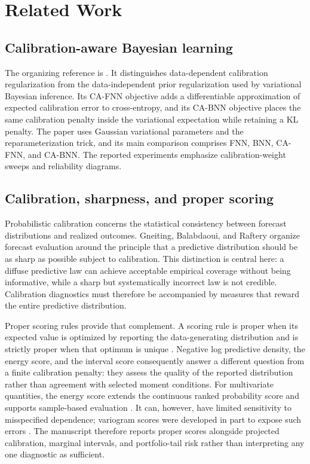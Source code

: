 \documentclass[11pt]{article}
\begin{document}
\section{Related Work}

\subsection{Calibration-aware Bayesian learning}

The organizing reference is \cite{huang2024cabl}. It distinguishes
data-dependent calibration regularization from the data-independent prior
regularization used by variational Bayesian inference. Its CA-FNN objective adds a
differentiable approximation of expected calibration error to cross-entropy, and
its CA-BNN objective places the same calibration penalty inside the variational
expectation while retaining a KL penalty. The paper uses Gaussian variational
parameters and the reparameterization trick, and its main comparison comprises
FNN, BNN, CA-FNN, and CA-BNN. The reported experiments emphasize calibration-weight
sweeps and reliability diagrams.

\subsection{Calibration, sharpness, and proper scoring}

Probabilistic calibration concerns the statistical consistency between forecast
distributions and realized outcomes.  Gneiting, Balabdaoui, and Raftery
\cite{gneiting2007calibration} organize forecast evaluation around the principle
that a predictive distribution should be as sharp as possible subject to
calibration.  This distinction is central here: a diffuse predictive law can
achieve acceptable empirical coverage without being informative, while a sharp
but systematically incorrect law is not credible.  Calibration diagnostics must
therefore be accompanied by measures that reward the entire predictive
distribution.

Proper scoring rules provide that complement.  A scoring rule is proper when its
expected value is optimized by reporting the data-generating distribution and is
strictly proper when that optimum is unique \cite{gneiting2007scoring}.  Negative
log predictive density, the energy score, and the interval score consequently
answer a different question from a finite calibration penalty: they assess the
quality of the reported distribution rather than agreement with selected moment
conditions.  For multivariate quantities, the energy score extends the
continuous ranked probability score and supports sample-based evaluation
\cite{gneiting2008multivariate}.  It can, however, have limited sensitivity to
misspecified dependence; variogram scores were developed in part to expose such
errors \cite{scheuerer2015variogram}.  The manuscript therefore reports proper
scores alongside projected calibration, marginal intervals, and portfolio-tail
risk rather than interpreting any one diagnostic as sufficient.
\end{document}
